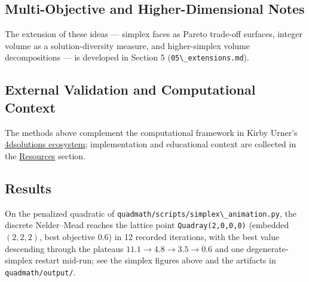 \documentclass[
  10pt,
]{article}
\newcommand{\passthrough}[1]{#1}
\begin{document}
\subsection{Multi-Objective and Higher-Dimensional
Notes}\label{multi-objective-and-higher-dimensional-notes}

The extension of these ideas --- simplex faces as Pareto trade-off
surfaces, integer volume as a solution-diversity measure, and
higher-simplex volume decompositions --- is developed in Section 5
(\passthrough{\lstinline!05\_extensions.md!}).

\subsection{External Validation and Computational
Context}\label{external-validation-and-computational-context}

The methods above complement the computational framework in Kirby
Urner's \href{https://github.com/4dsolutions}{4dsolutions ecosystem};
implementation and educational context are collected in the
\href{07_resources.md}{Resources} section.

\subsection{Results}\label{results}

On the penalized quadratic of
\passthrough{\lstinline!quadmath/scripts/simplex\_animation.py!}, the
discrete Nelder--Mead reaches the lattice point
\passthrough{\lstinline!Quadray(2,0,0,0)!} (embedded \((2, 2, 2)\), best
objective \(0.6\)) in 12 recorded iterations, with the best value
descending through the plateaus \(11.1 \to 4.8 \to 3.5 \to 0.6\) and one
degenerate-simplex restart mid-run; see the simplex figures above and
the artifacts in \passthrough{\lstinline!quadmath/output/!}.
\end{document}
